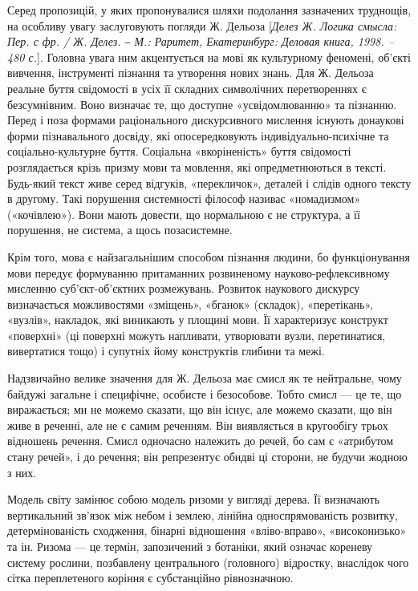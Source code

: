 Серед пропозицій, у яких пропонувалися шляхи подолання зазначених
труднощів, на особливу увагу заслуговують погляди Ж. Дельоза [\textit{Делез Ж.
Логика смысла: Пер. с фр. / Ж. Делез. ‒ М.: Раритет, Екатеринбург: Деловая
книга, 1998. – 480 с.}]. Головна увага ним акцентується на мові як культурному
феномені, об’єкті вивчення, інструменті пізнання та утворення нових знань.
Для Ж. Дельоза реальне буття свідомості в усіх її складних символічних
перетвореннях є безсумнівним. Воно визначає те, що доступне
«усвідомлюванню» та пізнанню. Перед і поза формами раціонального
дискурсивного мислення існують донаукові форми пізнавального досвіду, які
опосередковують індивідуально-психічне та соціально-культурне буття.
Соціальна «вкоріненість» буття свідомості розглядається крізь призму мови та
мовлення, які опредметнюються в тексті. Будь-який текст живе серед відгуків,
«перекличок», деталей і слідів одного тексту в другому. Такі порушення
системності філософ називає «номадизмом» («кочівлею»). Вони мають довести,
що нормальною є не структура, а її порушення, не система, а щось
позасистемне.

Крім того, мова є найзагальнішим способом пізнання людини, бо
функціонування мови передує формуванню притаманних розвиненому
науково-рефлексивному мисленню суб’єкт-об’єктних розмежувань. Розвиток
наукового дискурсу визначається можливостями «зміщ\-ень», «бганок»
(складок), «перетікань», «вузлів», накладок, які виникають у площині мови. Її
характеризує конструкт «поверхні» (ці поверхні можуть напливати, утворювати
вузли, перетинатися, вивертатися тощо) і супутніх йому конструктів глибини та
межі.

Надзвичайно велике значення для Ж. Дельоза має смисл як те нейтральне,
чому байдужі загальне і специфічне, особисте і безособове. Тобто смисл --- це
те, що виражається; ми не можемо сказати, що він існує, але можемо сказати,
що він живе в реченні, але не є самим реченням. Він виявляється в кругообігу
трьох відношень речення. Смисл одночасно належить до речей, бо сам є
«атрибутом стану речей», і до речення; він репрезентує обидві ці сторони, не
будучи жодною з них.

Модель світу замінює собою модель ризоми у вигляді дерева. Її визначають
вертикальний зв’язок між небом і землею, лінійна односпрямованість розвитку,
детермінованість сходження, бінарні відношення «вліво-вправо», «високонизько» та ін. Ризома --- це термін, запозичений з ботаніки, який означає
кореневу систему рослини, позбавлену центрального (головного) відростку,
внаслідок чого сітка переплетеного коріння є субстанційно рівнозначною.

